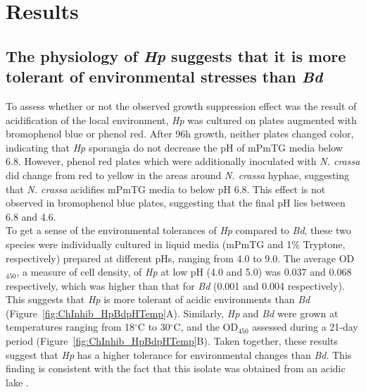 \section{Results}
\subsection*{The physiology of \textit{Hp} suggests that it is more tolerant of environmental stresses than \textit{Bd}}
To assess whether or not the observed growth suppression effect was the result of acidification of the local environment, \textit{Hp} was cultured on plates augmented with bromophenol blue or phenol red. After 96h growth, neither plates changed color, indicating that \textit{Hp} sporangia do not decrease the pH of mPmTG media below 6.8. However, phenol red plates which were additionally inoculated with \textit{N. crassa} did change from red to yellow in the areas around \textit{N. crassa} hyphae, suggesting that \textit{N. crassa} acidifies mPmTG media to below pH 6.8. This effect is not observed in bromophenol blue plates, suggesting that the final pH lies between 6.8 and 4.6.\\
\indent To get a sense of the environmental tolerances of \textit{Hp} compared to \textit{Bd}, these two species were individually cultured in liquid media (mPmTG and 1\% Tryptone, respectively) prepared at different pHs, ranging from 4.0 to 9.0. The average OD$_{450}$, a measure of cell density, of \textit{Hp} at low pH (4.0 and 5.0) was 0.037 and 0.068 respectively, which was higher than that for \textit{Bd} (0.001 and 0.004 respectively). This suggests that \textit{Hp} is more tolerant of acidic environments than \textit{Bd} (Figure~\ref{fig:ChInhib_HpBdpHTemp}A). Similarly, \textit{Hp} and \textit{Bd} were grown at temperatures ranging from 18$^{\circ}$C to 30$^{\circ}$C, and the OD$_{450}$ assessed during a 21-day period (Figure~\ref{fig:ChInhib_HpBdpHTemp}B). Taken together, these results suggest that \textit{Hp} has a higher tolerance for environmental changes than \textit{Bd}. This finding is consistent with the fact that this isolate was obtained from an acidic lake \cite{Longcore2011}.\\
